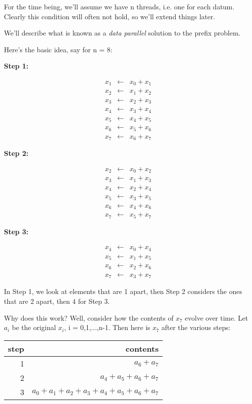 For the time being, we'll assume we have n threads, i.e. one for each
datum.  Clearly this condition will often not hold, so we'll extend
things later.

We'll describe what is known as a {\it data parallel} solution to the
prefix problem.  

Here's the basic idea, say for n = 8:

{\bf Step 1:}

\begin{eqnarray}
x_1 &\leftarrow& x_0 + x_1 \\
x_2 &\leftarrow& x_1 + x_2 \\
x_3 &\leftarrow& x_2 + x_3 \\
x_4 &\leftarrow& x_3 + x_4 \\
x_5 &\leftarrow& x_4 + x_5 \\
x_6 &\leftarrow& x_5 + x_6 \\
x_7 &\leftarrow& x_6 + x_7
\end{eqnarray}

{\bf Step 2:}

\begin{eqnarray}
x_2 &\leftarrow& x_0 + x_2 \\
x_3 &\leftarrow& x_1 + x_3 \\
x_4 &\leftarrow& x_2 + x_4 \\
x_5 &\leftarrow& x_3 + x_5 \\
x_6 &\leftarrow& x_4 + x_6 \\
x_7 &\leftarrow& x_5 + x_7
\end{eqnarray}

{\bf Step 3:}

\begin{eqnarray}
x_4 &\leftarrow& x_0 + x_4 \\
x_5 &\leftarrow& x_1 + x_5 \\
x_6 &\leftarrow& x_2 + x_6 \\
x_7 &\leftarrow& x_3 + x_7
\end{eqnarray}

In Step 1, we look at elements that are 1 apart, then Step 2 considers
the ones that are 2 apart, then 4 for Step 3.

Why does this work?  Well, consider how the contents of $x_7$ evolve
over time.  Let $a_i$ be the original $x_i$, i = 0,1,...,n-1.  Then here
is $x_7$ after the various steps:

\begin{tabular}{|r|r|}
\hline
step & contents \\ \hline
\hline
1 & $a_6+a_7$ \\ \hline 
2 & $a_4+a_5+a_6+a_7$ \\ \hline 
3 & $a_0+a_1+a_2+a_3 + a_4+a_5+a_6+a_7$ \\ \hline 
\end{tabular}

